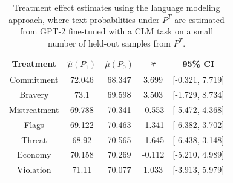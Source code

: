 \documentclass{article}
\begin{document}
\begin{table}[!ht]
    \centering
    \begin{tabular}{c|cccc}
        \toprule
        Treatment & $\hat{\mu}(P_1)$ & $\hat{\mu}(P_0)$ & $\hat{\tau}$ & 95\% CI \\
        \midrule
        Commitment & 72.046 & 68.347 & \textcolor{green!50!black}{3.699} & [-0.321, 7.719] \\
        Bravery & 73.1 & 69.598 & \textcolor{green!50!black}{3.503} & [-1.729, 8.734] \\
        Mistreatment & 69.788 & 70.341 & \textcolor{red!80!black}{-0.553} & [-5.472, 4.368] \\
        Flags & 69.122 & 70.463 & \textcolor{red!80!black}{-1.341} & [-6.382, 3.702] \\
        Threat & 68.92 & 70.565 & \textcolor{red!80!black}{-1.645} & [-6.438, 3.148] \\
        Economy & 70.158 & 70.269 & \textcolor{red!80!black}{-0.112} & [-5.210, 4.989] \\
        Violation & 71.11 & 70.077 & \textcolor{green!50!black}{1.033} & [-3.913, 5.979] \\
        \bottomrule
    \end{tabular}
    \caption{Treatment effect estimates using the language modeling approach, where text probabilities under $P^T$ are estimated from GPT-2 fine-tuned with a CLM task on a small number of held-out samples from $P^T$.}
    \label{tab:results_clm_gpt2_finetuned}
\end{table}

\end{document}
